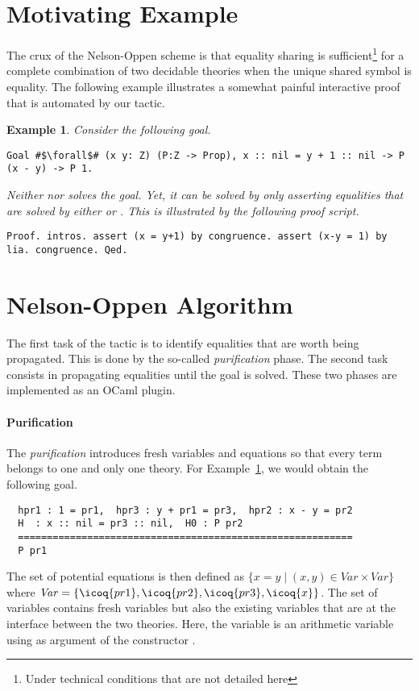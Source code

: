 \documentclass{easychair}
\newtheorem{example}{Example}
\begin{document}
\section{Motivating Example}
The crux of the Nelson-Oppen scheme is that equality sharing is
sufficient\footnote{Under technical conditions that are not detailed here} for
a complete combination of two decidable theories  when
the unique shared symbol is equality. The following example
illustrates a somewhat painful interactive proof that is automated by our
 tactic.
\begin{example}
  \label{exa:motivating}
  Consider the following goal.
\begin{verbatim}
Goal #$\forall$# (x y: Z) (P:Z -> Prop), x :: nil = y + 1 :: nil -> P (x - y) -> P 1.
\end{verbatim}
Neither  nor  solves the goal. Yet, it can
be solved by only asserting equalities that are solved by either  or .
This is illustrated by the following proof script.
\begin{verbatim}
Proof. intros. assert (x = y+1) by congruence. assert (x-y = 1) by lia. congruence. Qed.
\end{verbatim}
\end{example}

\section{Nelson-Oppen Algorithm}
The first task of the  tactic is to identify equalities that
are worth being propagated. This is done by the so-called
\emph{purification} phase. The second task consists in propagating
equalities until the goal is solved. These two phases are implemented
as an OCaml plugin.

\paragraph{Purification}
The \emph{purification} introduces fresh variables and
equations so that every term belongs to one and only one theory.
For Example~\ref{exa:motivating}, we would obtain the following goal.
\begin{verbatim}
  hpr1 : 1 = pr1,  hpr3 : y + pr1 = pr3,  hpr2 : x - y = pr2
  H  : x :: nil = pr3 :: nil,  H0 : P pr2
  ==========================================================
  P pr1
\end{verbatim}
The set of potential equations is then defined as
$
\{ x = y \mid (x,y) \in \mathit{Var} \times \mathit{Var} \}
$
where $\mathit{Var} = \{\icoq{pr1},\icoq{pr2}, \icoq{pr3}, \icoq{x} \}$.
%
The set of variables contains fresh variables but also the existing
variables that are at the interface between the two theories.  Here,
the variable  is an arithmetic variable using as argument of
the constructor \icoq{::}.
\end{document}
